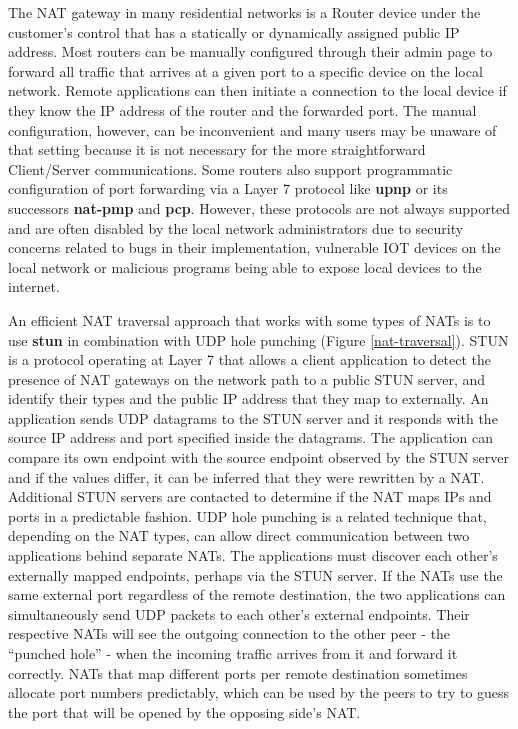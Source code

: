 The NAT gateway in many residential networks is a Router device under
the customer's control that has a statically or dynamically assigned
public IP address. Most routers can be manually configured through their
admin page to forward all traffic that arrives at a given port to a
specific device on the local network. Remote applications can then
initiate a connection to the local device if they know the IP address of
the router and the forwarded port. The manual configuration, however,
can be inconvenient and many users may be unaware of that setting
because it is not necessary for the more straightforward Client/Server
communications. Some routers also support programmatic configuration of
port forwarding via a Layer 7 protocol like \textbf{\gls{upnp}} or its
successors \textbf{\gls{nat-pmp}} and \textbf{\gls{pcp}}. However, these
protocols are not always supported and are often disabled by the local
network administrators due to security concerns related to bugs in their
implementation, vulnerable IOT devices on the local network or malicious
programs being able to expose local devices to the internet.


An efficient NAT traversal approach that works with some types of NATs
is to use \textbf{\gls{stun}} \autocite{stunRFC} in combination with UDP
hole punching (Figure \ref{nat-traversal}). STUN is a protocol operating
at Layer 7 that allows a client application to detect the presence of
NAT gateways on the network path to a public STUN server, and identify
their types and the public IP address that they map to externally. An
application sends UDP datagrams to the STUN server and it responds with
the source IP address and port specified inside the datagrams. The
application can compare its own endpoint with the source endpoint
observed by the STUN server and if the values differ, it can be inferred
that they were rewritten by a NAT. Additional STUN servers are contacted
to determine if the NAT maps IPs and ports in a predictable fashion. UDP
hole punching is a related technique that, depending on the NAT types,
can allow direct communication between two applications behind separate
NATs. The applications must discover each other's externally mapped
endpoints, perhaps via the STUN server.  If the NATs use
the same external port regardless of the remote destination, the two
applications can simultaneously send UDP packets to each other's
external endpoints. Their respective NATs will see the outgoing
connection to the other peer - the ``punched hole'' - when the incoming
traffic arrives from it and forward it correctly. NATs that map
different ports per remote destination sometimes allocate port numbers
predictably, which can be used by the peers to try to guess the port
that will be opened by the opposing side's NAT.

